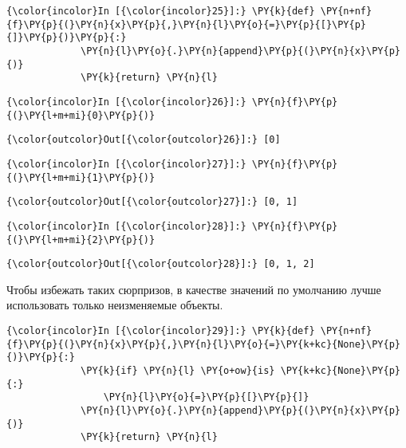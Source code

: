     \begin{Verbatim}[commandchars=\\\{\}]
{\color{incolor}In [{\color{incolor}25}]:} \PY{k}{def} \PY{n+nf}{f}\PY{p}{(}\PY{n}{x}\PY{p}{,}\PY{n}{l}\PY{o}{=}\PY{p}{[}\PY{p}{]}\PY{p}{)}\PY{p}{:}
             \PY{n}{l}\PY{o}{.}\PY{n}{append}\PY{p}{(}\PY{n}{x}\PY{p}{)}
             \PY{k}{return} \PY{n}{l}
\end{Verbatim}

    \begin{Verbatim}[commandchars=\\\{\}]
{\color{incolor}In [{\color{incolor}26}]:} \PY{n}{f}\PY{p}{(}\PY{l+m+mi}{0}\PY{p}{)}
\end{Verbatim}

            \begin{Verbatim}[commandchars=\\\{\}]
{\color{outcolor}Out[{\color{outcolor}26}]:} [0]
\end{Verbatim}
        
    \begin{Verbatim}[commandchars=\\\{\}]
{\color{incolor}In [{\color{incolor}27}]:} \PY{n}{f}\PY{p}{(}\PY{l+m+mi}{1}\PY{p}{)}
\end{Verbatim}

            \begin{Verbatim}[commandchars=\\\{\}]
{\color{outcolor}Out[{\color{outcolor}27}]:} [0, 1]
\end{Verbatim}
        
    \begin{Verbatim}[commandchars=\\\{\}]
{\color{incolor}In [{\color{incolor}28}]:} \PY{n}{f}\PY{p}{(}\PY{l+m+mi}{2}\PY{p}{)}
\end{Verbatim}

            \begin{Verbatim}[commandchars=\\\{\}]
{\color{outcolor}Out[{\color{outcolor}28}]:} [0, 1, 2]
\end{Verbatim}
        
    Чтобы избежать таких сюрпризов, в качестве значений по умолчанию лучше
использовать только неизменяемые объекты.

    \begin{Verbatim}[commandchars=\\\{\}]
{\color{incolor}In [{\color{incolor}29}]:} \PY{k}{def} \PY{n+nf}{f}\PY{p}{(}\PY{n}{x}\PY{p}{,}\PY{n}{l}\PY{o}{=}\PY{k+kc}{None}\PY{p}{)}\PY{p}{:}
             \PY{k}{if} \PY{n}{l} \PY{o+ow}{is} \PY{k+kc}{None}\PY{p}{:}
                 \PY{n}{l}\PY{o}{=}\PY{p}{[}\PY{p}{]}
             \PY{n}{l}\PY{o}{.}\PY{n}{append}\PY{p}{(}\PY{n}{x}\PY{p}{)}
             \PY{k}{return} \PY{n}{l}
\end{Verbatim}

